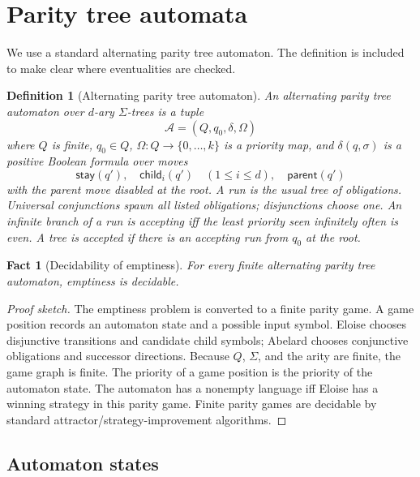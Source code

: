 \documentclass[11pt]{article}
\newtheorem{definition}[theorem]{Definition}
\newtheorem{fact}[theorem]{Fact}
\begin{document}
\section{Parity tree automata}\label{sec:automaton}

We use a standard alternating parity tree automaton.  The definition is included to make clear where eventualities are checked.

\begin{definition}[Alternating parity tree automaton]
An alternating parity tree automaton over $d$-ary $\Sigma$-trees is a tuple
\[
  \mathcal A=(Q,q_0,\delta,\Omega)
\]
where $Q$ is finite, $q_0\in Q$, $\Omega:Q\to\{0,\ldots,k\}$ is a priority map, and $\delta(q,\sigma)$ is a positive Boolean formula over moves
\[
  \mathsf{stay}(q'),\quad \mathsf{child}_i(q')\quad(1\le i\le d),\quad \mathsf{parent}(q')
\]
with the parent move disabled at the root.  A run is the usual tree of obligations.  Universal conjunctions spawn all listed obligations; disjunctions choose one.  An infinite branch of a run is accepting iff the least priority seen infinitely often is even.  A tree is accepted if there is an accepting run from $q_0$ at the root.
\end{definition}

\begin{fact}[Decidability of emptiness]
For every finite alternating parity tree automaton, emptiness is decidable.
\end{fact}

\begin{proof}[Proof sketch]
The emptiness problem is converted to a finite parity game.  A game position records an automaton state and a possible input symbol.  Eloise chooses disjunctive transitions and candidate child symbols; Abelard chooses conjunctive obligations and successor directions.  Because $Q$, $\Sigma$, and the arity are finite, the game graph is finite.  The priority of a game position is the priority of the automaton state.  The automaton has a nonempty language iff Eloise has a winning strategy in this parity game.  Finite parity games are decidable by standard attractor/strategy-improvement algorithms.
\end{proof}

\subsection{Automaton states}
\end{document}
